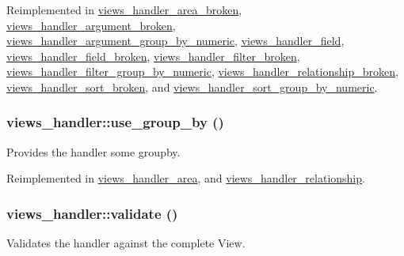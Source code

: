 Reimplemented in \hyperlink{classviews__handler__area__broken_a73198c332f1b3e2c9b5fcd719a4f4fb7}{views\_\-handler\_\-area\_\-broken}, \hyperlink{classviews__handler__argument__broken_ac62b831ae47250571ae7449906c1687d}{views\_\-handler\_\-argument\_\-broken}, \hyperlink{classviews__handler__argument__group__by__numeric_aad9d8a9bd1b787224b8f811997c9d8eb}{views\_\-handler\_\-argument\_\-group\_\-by\_\-numeric}, \hyperlink{classviews__handler__field_a593c70c519615b5be3b5cd43cd1b663b}{views\_\-handler\_\-field}, \hyperlink{classviews__handler__field__broken_a0b3272926656e5fc3f6c011fa51746ed}{views\_\-handler\_\-field\_\-broken}, \hyperlink{classviews__handler__filter__broken_a199df5434e076ecc6889082a83f2e266}{views\_\-handler\_\-filter\_\-broken}, \hyperlink{classviews__handler__filter__group__by__numeric_a0b932b97100b4c0a365e710caf747b97}{views\_\-handler\_\-filter\_\-group\_\-by\_\-numeric}, \hyperlink{classviews__handler__relationship__broken_ad6a2ac8a5183f5293745ce27b55ac390}{views\_\-handler\_\-relationship\_\-broken}, \hyperlink{classviews__handler__sort__broken_ad83cfcffa971a65b6e306d6fac7f6c10}{views\_\-handler\_\-sort\_\-broken}, and \hyperlink{classviews__handler__sort__group__by__numeric_a06f1b398512f9302298848b2122fa834}{views\_\-handler\_\-sort\_\-group\_\-by\_\-numeric}.\hypertarget{classviews__handler_a929fa734f0c231cb81f52889652e6aef}{
\subsubsection[{use\_\-group\_\-by}]{\setlength{\rightskip}{0pt plus 5cm}views\_\-handler::use\_\-group\_\-by ()}}
\label{classviews__handler_a929fa734f0c231cb81f52889652e6aef}
Provides the handler some groupby. 

Reimplemented in \hyperlink{classviews__handler__area_afd0f5987bb450217d97f6fb5607e5f70}{views\_\-handler\_\-area}, and \hyperlink{classviews__handler__relationship_a23a370a6b1ba56280bbfe2262a0c91ec}{views\_\-handler\_\-relationship}.\hypertarget{classviews__handler_a323961657c7c5f3257a8fe4eeea1502f}{
\subsubsection[{validate}]{\setlength{\rightskip}{0pt plus 5cm}views\_\-handler::validate ()}}
\label{classviews__handler_a323961657c7c5f3257a8fe4eeea1502f}
Validates the handler against the complete View.

